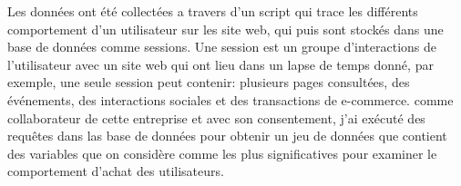 
Les données ont été collectées a travers d'un script qui trace les différents comportement d'un utilisateur sur les site web, qui puis sont stockés dans une base de données comme sessions. Une session est un groupe d'interactions de l'utilisateur avec un site web qui ont lieu dans un lapse de temps donné, par exemple, une seule session peut contenir: plusieurs pages consultées, des événements, des interactions sociales et des transactions de e-commerce. comme collaborateur de cette entreprise et avec son consentement, j'ai exécuté des requêtes dans las base de données pour obtenir un jeu de données que contient des variables que on considère comme les plus significatives pour examiner le comportement d'achat des utilisateurs.




